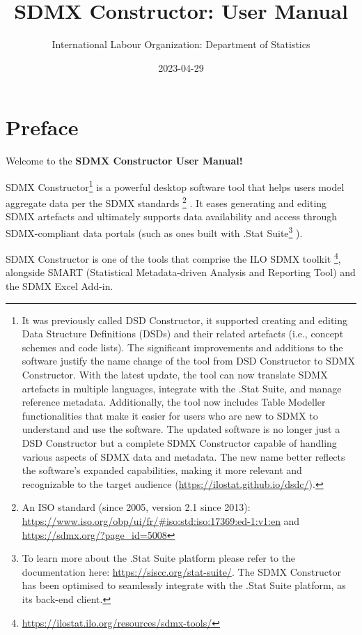 \documentclass[
]{book}
\title{SDMX Constructor: User Manual}
\author{International Labour Organization: Department of Statistics}
\date{2023-04-29}
\theoremstyle{definition}
\theoremstyle{definition}
\theoremstyle{definition}
\theoremstyle{definition}
\theoremstyle{remark}
\begin{document}
\maketitle

{
\setcounter{tocdepth}{1}
\tableofcontents
}
\hypertarget{preface}{%
\chapter*{Preface}\label{preface}}

Welcome to the \textbf{SDMX Constructor User Manual!}

SDMX Constructor\footnote{It was previously called DSD Constructor, it supported creating and editing Data Structure Definitions (DSDs) and their related artefacts (i.e., concept schemes and code lists). The significant improvements and additions to the software justify the name change of the tool from DSD Constructor to SDMX Constructor. With the latest update, the tool can now translate SDMX artefacts in multiple languages, integrate with the .Stat Suite, and manage reference metadata. Additionally, the tool now includes Table Modeller functionalities that make it easier for users who are new to SDMX to understand and use the software. The updated software is no longer just a DSD Constructor but a complete SDMX Constructor capable of handling various aspects of SDMX data and metadata. The new name better reflects the software's expanded capabilities, making it more relevant and recognizable to the target audience (\url{https://ilostat.github.io/dsdc/}).} is a powerful desktop software tool that helps users model aggregate data per the SDMX standards \footnote{An ISO standard (since 2005, version 2.1 since 2013): \url{https://www.iso.org/obp/ui/fr/\#iso:std:iso:17369:ed-1:v1:en} and \url{https://sdmx.org/?page_id=5008}} . It eases generating and editing SDMX artefacts and ultimately supports data availability and access through SDMX-compliant data portals (such as ones built with .Stat Suite\footnote{To learn more about the .Stat Suite platform please refer to the documentation here: \url{https://siscc.org/stat-suite/}. The SDMX Constructor has been optimised to seamlessly integrate with the .Stat Suite platform, as its back-end client.} ).

SDMX Constructor is one of the tools that comprise the ILO SDMX toolkit \footnote{\url{https://ilostat.ilo.org/resources/sdmx-tools/}}, alongside SMART (Statistical Metadata-driven Analysis and Reporting Tool) and the SDMX Excel Add-in.
\end{document}
